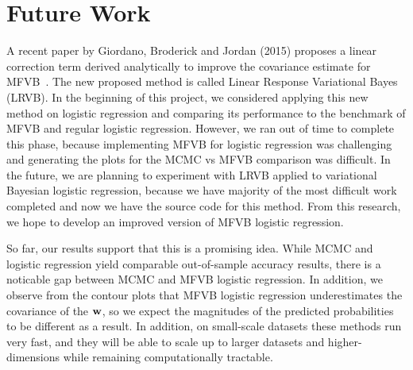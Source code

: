 
\section{Future Work}\label{sec:future}

A recent paper by Giordano, Broderick and Jordan (2015) proposes a linear correction term derived analytically to improve the covariance estimate for MFVB~\cite{giordano2015linear}.  The new proposed method is called Linear Response Variational Bayes (LRVB).  In the beginning of this project, we considered applying this new method on logistic regression and comparing its performance to the benchmark of MFVB and regular logistic regression.  However, we ran out of time to complete this phase, because implementing MFVB for logistic regression was challenging and generating the plots for the MCMC vs MFVB comparison was difficult.  In the future, we are planning to experiment with LRVB applied to variational Bayesian logistic regression, because we have majority of the most difficult work completed and now we have the source code for this method.  From this research, we hope to develop an improved version of MFVB logistic regression.

So far, our results support that this is a promising idea.  While MCMC and logistic regression yield comparable out-of-sample accuracy results, there is a noticable gap between MCMC and MFVB logistic regression.  In addition, we observe from the contour plots that MFVB logistic regression underestimates the covariance of the $\boldsymbol{\mathbf{w}}$, so we expect the magnitudes of the predicted probabilities to be different as a result.  In addition, on small-scale datasets these methods run very fast, and they will be able to scale up to larger datasets and higher-dimensions while remaining computationally tractable.